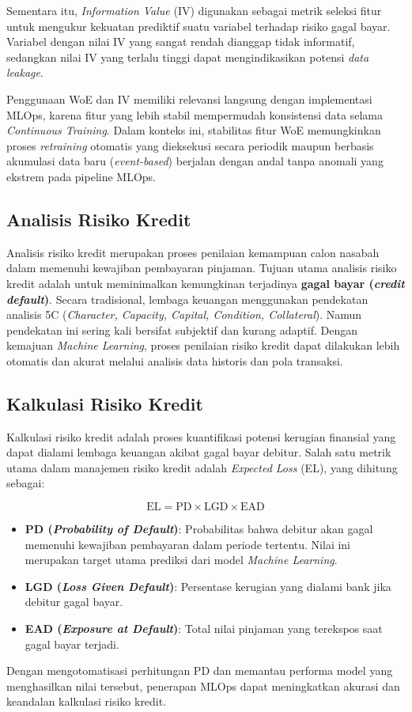 Sementara itu, \textit{Information Value} (IV) digunakan sebagai metrik seleksi fitur untuk mengukur kekuatan prediktif suatu variabel terhadap risiko gagal bayar. Variabel dengan nilai IV yang sangat rendah dianggap tidak informatif, sedangkan nilai IV yang terlalu tinggi dapat mengindikasikan potensi \textit{data leakage}.\cite{maurino2025data}

Penggunaan WoE dan IV memiliki relevansi langsung dengan implementasi MLOps, karena fitur yang lebih stabil mempermudah konsistensi data selama \textit{Continuous Training}. Dalam konteks ini, stabilitas fitur WoE memungkinkan proses \textit{retraining} otomatis yang dieksekusi secara periodik maupun berbasis akumulasi data baru (\textit{event-based}) berjalan dengan andal tanpa anomali yang ekstrem pada pipeline MLOps.\cite{Chang2024}


\subsection{Analisis Risiko Kredit}
Analisis risiko kredit merupakan proses penilaian kemampuan calon nasabah dalam memenuhi kewajiban pembayaran pinjaman. Tujuan utama analisis risiko kredit adalah untuk meminimalkan kemungkinan terjadinya \textbf{gagal bayar (\textit{credit default})}. Secara tradisional, lembaga keuangan menggunakan pendekatan analisis 5C (\textit{Character, Capacity, Capital, Condition, Collateral}). Namun pendekatan ini sering kali bersifat subjektif dan kurang adaptif. Dengan kemajuan \textit{Machine Learning}, proses penilaian risiko kredit dapat dilakukan lebih otomatis dan akurat melalui analisis data historis dan pola transaksi. \cite{ojk2024pojk29}
\subsection{Kalkulasi Risiko Kredit}
Kalkulasi risiko kredit adalah proses kuantifikasi potensi kerugian finansial yang dapat dialami lembaga keuangan akibat gagal bayar debitur. Salah satu metrik utama dalam manajemen risiko kredit adalah \textit{Expected Loss} (EL), yang dihitung sebagai:

\[
\text{EL} = \text{PD} \times \text{LGD} \times \text{EAD} 
\]
\begin{itemize}
    \item \textbf{PD (\textit{Probability of Default})}: Probabilitas bahwa debitur akan gagal memenuhi kewajiban pembayaran dalam periode tertentu. Nilai ini merupakan target utama prediksi dari model \textit{Machine Learning}.
    \item \textbf{LGD (\textit{Loss Given Default})}: Persentase kerugian yang dialami bank jika debitur gagal bayar.
    \item \textbf{EAD (\textit{Exposure at Default})}: Total nilai pinjaman yang terekspos saat gagal bayar terjadi.
\end{itemize}
Dengan mengotomatisasi perhitungan PD dan memantau performa model yang menghasilkan nilai tersebut, penerapan MLOps dapat meningkatkan akurasi dan keandalan kalkulasi risiko kredit.\cite{Chang2024}

